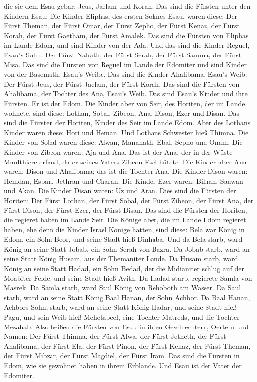 die sie dem Esau gebar: Jeus, Jaelam und Korah. Das sind die Fürsten unter den Kindern Esau: Die Kinder Eliphas, des ersten Sohnes Esau, waren diese: Der Fürst Theman, der Fürst Omar, der Fürst Zepho, der Fürst Kenaz, der Fürst Korah, der Fürst Gaetham, der Fürst Amalek. Das sind die Fürsten von Eliphas im Lande Edom, und sind Kinder von der Ada. Und das sind die Kinder Reguel, Esau’s Sohn: Der Fürst Nahath, der Fürst Serah, der Fürst Samma, der Fürst Misa. Das sind die Fürsten von Reguel im Lande der Edomiter und sind Kinder von der Basemath, Esau’s Weibe. Das sind die Kinder Ahalibama, Esau’s Weib: Der Fürst Jeus, der Fürst Jaelam, der Fürst Korah. Das sind die Fürsten von Ahalibama, der Tochter des Ana, Esau’s Weib. Das sind Esau’s Kinder und ihre Fürsten. Er ist der Edom. Die Kinder aber von Seir, des Horiten, der im Lande wohnete, sind diese: Lothan, Sobal, Zibeon, Ana, Dison, Ezer und Disan. Das sind die Fürsten der Horiten, Kinder des Seir im Lande Edom. Aber des Lothans Kinder waren diese: Hori und Heman. Und Lothans Schwester hieß Thimna. Die Kinder von Sobal waren diese: Alwan, Manahath, Ebal, Sepho und Onam. Die Kinder von Zibeon waren: Aja und Ana. Das ist der Ana, der in der Wüste Maulthiere erfand, da er seines Vaters Zibeon Esel hütete. Die Kinder aber Ana waren: Dison und Ahalibama; das ist die Tochter Ana. Die Kinder Dison waren: Hemdan, Esban, Jethran und Charan. Die Kinder Ezer waren: Bilhan, Saawan und Akan. Die Kinder Disan waren: Uz und Aran. Dies sind die Fürsten der Horiten: Der Fürst Lothan, der Fürst Sobal, der Fürst Zibeon, der Fürst Ana, der Fürst Dison, der Fürst Ezer, der Fürst Disan. Das sind die Fürsten der Horiten, die regieret haben im Lande Seir. Die Könige aber, die im Lande Edom regieret haben, ehe denn die Kinder Israel Könige hatten, sind diese: Bela war König in Edom, ein Sohn Beor, und seine Stadt hieß Dinhaba. Und da Bela starb, ward König an seine Statt Jobab, ein Sohn Serah von Bazra. Da Jobab starb, ward an seine Statt König Husam, aus der Themaniter Lande. Da Husam starb, ward König an seine Statt Hadad, ein Sohn Bedad, der die Midianiter schlug auf der Moabiter Felde, und seine Stadt hieß Avith. Da Hadad starb, regierete Samla von Masrek. Da Samla starb, ward Saul König von Rehoboth am Wasser. Da Saul starb, ward an seine Statt König Baal Hanan, der Sohn Achbor. Da Baal Hanan, Achbors Sohn, starb, ward an seine Statt König Hadar, und seine Stadt hieß Pagu, und sein Weib hieß Mehetabeel, eine Tochter Matreds, und die Tochter Mesahab. Also heißen die Fürsten von Esau in ihren Geschlechtern, Oertern und Namen: Der Fürst Thimna, der Fürst Alwa, der Fürst Jetheth, der Fürst Ahalibama, der Fürst Ela, der Fürst Pinon, der Fürst Kenaz, der Fürst Theman, der Fürst Mibzar, der Fürst Magdiel, der Fürst Iram. Das sind die Fürsten in Edom, wie sie gewohnet haben in ihrem Erblande. Und Esau ist der Vater der Edomiter.

